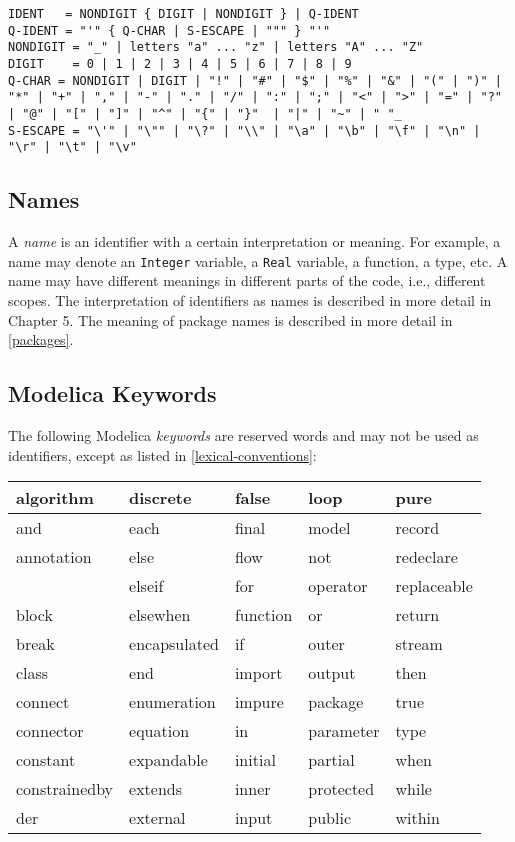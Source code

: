 \begin{lstlisting}[language=grammar]
IDENT   = NONDIGIT { DIGIT | NONDIGIT } | Q-IDENT
Q-IDENT = "'" { Q-CHAR | S-ESCAPE | """ } "'"
NONDIGIT = "_" | letters "a" ... "z" | letters "A" ... "Z"
DIGIT    = 0 | 1 | 2 | 3 | 4 | 5 | 6 | 7 | 8 | 9
Q-CHAR = NONDIGIT | DIGIT | "!" | "#" | "$" | "%" | "&" | "(" | ")" | "*" | "+" | "," | "-" | "." | "/" | ":" | ";" | "<" | ">" | "=" | "?" | "@" | "[" | "]" | "^" | "{" | "}"  | "|" | "~" | " "_
S-ESCAPE = "\'" | "\"" | "\?" | "\\" | "\a" | "\b" | "\f" | "\n" | "\r" | "\t" | "\v"
\end{lstlisting}

\subsection{Names}

A \emph{name} is an identifier with a certain interpretation or meaning.
For example, a name may denote an \lstinline[basicstyle=\ttfamily]!Integer! variable, a \lstinline[basicstyle=\ttfamily]!Real! variable, a
function, a type, etc. A name may have different meanings in different
parts of the code, i.e., different scopes. The interpretation of
identifiers as names is described in more detail in Chapter 5. The
meaning of package names is described in more detail in \autoref{packages}.

\subsection{Modelica Keywords}

The following Modelica \emph{keywords} are reserved words and may not be
used as identifiers, except as listed in \autoref{lexical-conventions}:

\begin{longtable}[c]{@{}lllll@{}}
algorithm & discrete & false & loop & pure\\ \hline
and & each & final & model & record\\ \hline
annotation & else & flow & not & redeclare\\ \hline
& elseif & for & operator & replaceable\\ \hline
block & elsewhen & function & or & return\\ \hline
break & encapsulated & if & outer & stream\\ \hline
class & end & import & output & then\\ \hline
connect & enumeration & impure & package & true\\ \hline
connector & equation & in & parameter & type\\ \hline
constant & expandable & initial & partial & when\\ \hline
constrainedby & extends & inner & protected & while\\ \hline
der & external & input & public & within\\ \hline
\end{longtable}


